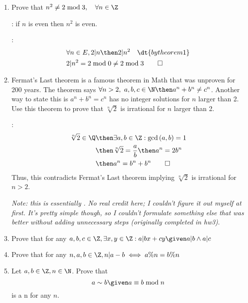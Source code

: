 \documentclass[basic, header]{nosvagor-notes}
\begin{document}
\begin{enumerate}[itemsep=4em]

  \item Prove that \(n^2 \neq 2 \bmod 3, \quad \forall n \in \Z \)

    : if \(n\) is even then \(n^2\) is even.

    :
    \begin{align*}
      &\forall n \in E, 2|n  \then 2|n^2 \quad \dt{by theorem 1} \\
      &2|n^2 = 2 \bmod 0 \neq 2 \bmod 3 \qed
    \end{align*}

  \item Fermat’s Last theorem is a famous theorem in Math that was unproven for
    200 years. The theorem says \(\forall n > 2,~ a,b,c \in \N \then  a^n +
    b^n \neq c^n\). Another way to state this is \(a^n + b^n = c^n\) has no integer
    solutions for $n$ larger than 2. Use this theorem to prove that \(\sqrt[n]{2}\) is
    irrational for $n$ larger than 2.

    :
    \begin{align*}
    \sqrt[n]{2} \in \Q &\then \exists a,b \in \Z : \gcd{(a,b)}=1 \\
                         &\then \sqrt[n]{2} = \frac{a}{b} \then a^n = 2b^n \\
                         &\then a^n = b^n + b^n \qed
    \end{align*}
    Thus, this contradicts Fermat's Last theorem implying \(\sqrt[n]{2}\) is
    irrational for \(n > 2\).

    \textit{Note: this is essentially
      . No real
      credit here; I couldn't figure it out myself at first. It's pretty simple
      though, so I couldn't formulate something else that was better without
      adding unnecessary steps (originally completed in hw3)}.

    \item Prove that for any \(a,b,c \in \Z, \exists x,y \in \Z : a|bx+cy
      \given a|b \land a|c\)

    \item Prove that for any \( n,a,b \in \Z, n|a-b \iff a\%n = b\%n\)

  \newpage %

    \item Let \(a, b \in \Z, n \in \N\). Prove that \[a \sim b \given a \equiv
      b \bmod n\]
      is a n
      for any \(n\).


\end{enumerate}
\end{document}
